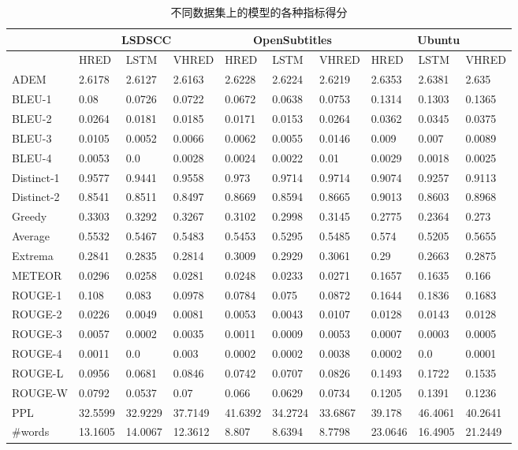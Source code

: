 \begin{table}%
\centering%
\caption{不同数据集上的模型的各种指标得分}%
\label{tab:systemScoresAll}%
\begin{tabular}{|l|l|l|l|l|l|l|l|l|l|}%
\hline%
&\multicolumn{3}{c|}{LSDSCC}&\multicolumn{3}{c|}{OpenSubtitles}&\multicolumn{3}{c|}{Ubuntu}\\%
\hline%
&HRED&LSTM&VHRED&HRED&LSTM&VHRED&HRED&LSTM&VHRED\\%
\hline%
ADEM&2.6178&2.6127&2.6163&2.6228&2.6224&2.6219&2.6353&2.6381&2.635\\%
\hline%
BLEU{-}1&0.08&0.0726&0.0722&0.0672&0.0638&0.0753&0.1314&0.1303&0.1365\\%
\hline%
BLEU{-}2&0.0264&0.0181&0.0185&0.0171&0.0153&0.0264&0.0362&0.0345&0.0375\\%
\hline%
BLEU{-}3&0.0105&0.0052&0.0066&0.0062&0.0055&0.0146&0.009&0.007&0.0089\\%
\hline%
BLEU{-}4&0.0053&0.0&0.0028&0.0024&0.0022&0.01&0.0029&0.0018&0.0025\\%
\hline%
Distinct{-}1&0.9577&0.9441&0.9558&0.973&0.9714&0.9714&0.9074&0.9257&0.9113\\%
\hline%
Distinct{-}2&0.8541&0.8511&0.8497&0.8669&0.8594&0.8665&0.9013&0.8603&0.8968\\%
\hline%
Greedy&0.3303&0.3292&0.3267&0.3102&0.2998&0.3145&0.2775&0.2364&0.273\\%
\hline%
Average&0.5532&0.5467&0.5483&0.5453&0.5295&0.5485&0.574&0.5205&0.5655\\%
\hline%
Extrema&0.2841&0.2835&0.2814&0.3009&0.2929&0.3061&0.29&0.2663&0.2875\\%
\hline%
METEOR&0.0296&0.0258&0.0281&0.0248&0.0233&0.0271&0.1657&0.1635&0.166\\%
\hline%
ROUGE{-}1&0.108&0.083&0.0978&0.0784&0.075&0.0872&0.1644&0.1836&0.1683\\%
\hline%
ROUGE{-}2&0.0226&0.0049&0.0081&0.0053&0.0043&0.0107&0.0128&0.0143&0.0128\\%
\hline%
ROUGE{-}3&0.0057&0.0002&0.0035&0.0011&0.0009&0.0053&0.0007&0.0003&0.0005\\%
\hline%
ROUGE{-}4&0.0011&0.0&0.003&0.0002&0.0002&0.0038&0.0002&0.0&0.0001\\%
\hline%
ROUGE{-}L&0.0956&0.0681&0.0846&0.0742&0.0707&0.0826&0.1493&0.1722&0.1535\\%
\hline%
ROUGE{-}W&0.0792&0.0537&0.07&0.066&0.0629&0.0734&0.1205&0.1391&0.1236\\%
\hline%
PPL&32.5599&32.9229&37.7149&41.6392&34.2724&33.6867&39.178&46.4061&40.2641\\%
\hline%
\#words&13.1605&14.0067&12.3612&8.807&8.6394&8.7798&23.0646&16.4905&21.2449\\%
\hline%
\end{tabular}%
\end{table}